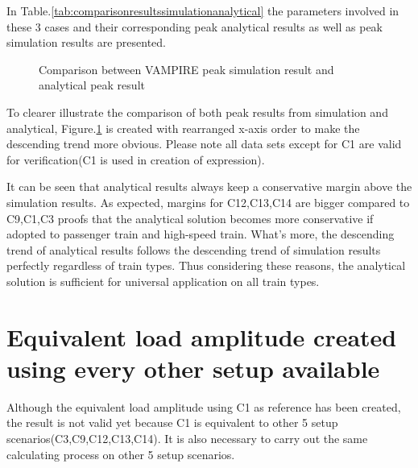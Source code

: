 In Table.\ref{tab:comparisonresultssimulationanalytical} the parameters involved in these 3 cases and their corresponding peak analytical results as well as peak simulation results are presented. 



\begin{figure}[h!]
\centering
{}
\caption{Comparison between VAMPIRE peak simulation result and analytical peak result}
\label{fig:comparisonpeaksimulationanalytical}
\end{figure}

To clearer illustrate the comparison of both peak results from simulation and analytical, Figure.\ref{fig:comparisonpeaksimulationanalytical} is created with rearranged x-axis order to make the descending trend more obvious. Please note all data sets except for C1 are valid for verification(C1 is used in creation of expression).

It can be seen that analytical results always keep a conservative margin above the simulation results. As expected, margins for C12,C13,C14 are bigger compared to C9,C1,C3 proofs that the analytical solution becomes more conservative if adopted to passenger train and high-speed train. What's more, the descending trend of analytical results follows the descending trend of simulation results perfectly regardless of train types. Thus considering these reasons, the analytical solution is sufficient for universal application on all train types.

\section{Equivalent load amplitude created using every other setup available}
Although the equivalent load amplitude using C1 as reference has been created, the result is not valid yet because C1 is equivalent to other 5 setup scenarios(C3,C9,C12,C13,C14). It is also necessary to carry out the same calculating process on other 5 setup scenarios.

